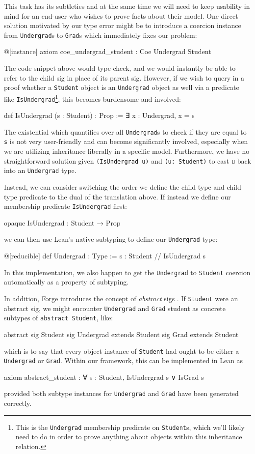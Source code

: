 This task has its subtleties and at the same time we will need to keep usability in mind for an end-user who wishes to prove facts about their model. One direct solution motivated by our type error might be to introduce a coercion instance from \texttt{Undergrad}s to \texttt{Grad}s which immediately fixes our problem:
\begin{lean*}@[instance] axiom coe_undergrad_student : Coe Undergrad Student\end{lean*}
The code snippet above would type check, and we would instantly be able to refer to the child sig in place of its parent sig. However, if we wish to query in a proof whether a \texttt{Student} object is an \texttt{Undergrad} object as well via a predicate like \texttt{IsUndergrad}\footnote{This is the \texttt{Undergrad} membership predicate on \texttt{Student}s, which we'll likely need to do in order to prove anything about objects within this inheritance relation.}, this becomes burdensome and involved:
\begin{lean*}def IsUndergrad (s : Student) : Prop := ∃ x : Undergrad, x = s\end{lean*}
The existential which quantifies over all \texttt{Undergrad}s to check if they are equal to \texttt{s} is not very user-friendly and can become significantly involved, especially when we are utilizing inheritance liberally in a specific model. Furthermore, we have no straightforward solution given \texttt{(IsUndergrad u)} and \texttt{(u: Student)} to cast \texttt{u} back into an \texttt{Undergrad} type. 

Instead, we can consider switching the order we define the child type and child type predicate to the dual of the translation above. If instead we define our membership predicate \texttt{IsUndergrad} first:
\begin{lean*}opaque IsUndergrad : Student → Prop\end{lean*}
we can then use Lean's native subtyping to define our \texttt{Undergrad} type:
\begin{lean*}
@[reducible] def Undergrad : Type :=
  { s : Student // IsUndergrad s }
\end{lean*}
In this implementation, we also happen to get the \texttt{Undergrad} to \texttt{Student} coercion automatically as a property of subtyping.

In addition, Forge introduces the concept of \emph{abstract} sigs \cite{jackson2012software}. If \texttt{Student} were an abstract sig, we might encounter \texttt{Undergrad} and \texttt{Grad} student as concrete subtypes of \texttt{abstract Student}, like:
\begin{forge*}
abstract sig Student {}
sig Undergrad extends Student {}
sig Grad extends Student {}
\end{forge*}
which is to say that every object instance of \texttt{Student} had ought to be either a \texttt{Undergrad} or \texttt{Grad}. Within our framework, this can be implemented in Lean as
\begin{lean*}
axiom abstract_student : ∀ s : Student, IsUndergrad s ∨ IsGrad s
\end{lean*}
provided both subtype instances for \texttt{Undergrad} and \texttt{Grad} have been generated correctly. 

